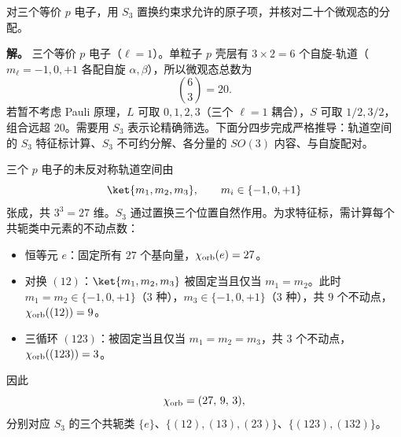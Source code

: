 \begin{example}[{$p^3$ 构型：$S_3$ 约束给出 $^4S,{}^2D,{}^2P$}]
对三个等价 $p$ 电子，用 $S_3$ 置换约束求允许的原子项，并核对二十个微观态的分配。

\textbf{解。} 三个等价 $p$ 电子（$\ell=1$）。单粒子 $p$ 壳层有 $3\times2=6$ 个自旋-轨道（$m_\ell=-1,0,+1$ 各配自旋 $\alpha,\beta$），所以微观态总数为
\[
\binom63=20.
\]
若暂不考虑 Pauli 原理，$L$ 可取 $0,1,2,3$（三个 $\ell=1$ 耦合），$S$ 可取 $1/2,3/2$，组合远超 20。需要用 $S_3$ 表示论精确筛选。下面分四步完成严格推导：轨道空间的 $S_3$ 特征标计算、$S_3$ 不可约分解、各分量的 $SO(3)$ 内容、与自旋配对。

三个 $p$ 电子的未反对称轨道空间由
\[
\ket{m_1,m_2,m_3},\qquad m_i\in\{-1,0,+1\}
\]
张成，共 $3^3=27$ 维。$S_3$ 通过置换三个位置自然作用。为求特征标，需计算每个共轭类中元素的不动点数：
\begin{itemize}
\item 恒等元 $e$：固定所有 $27$ 个基向量，$\chi_{\rm orb}(e)=27$。
\item 对换 $(12)$：$\ket{m_1,m_2,m_3}$ 被固定当且仅当 $m_1=m_2$。此时 $m_1=m_2\in\{-1,0,+1\}$（$3$ 种），$m_3\in\{-1,0,+1\}$（$3$ 种），共 $9$ 个不动点，$\chi_{\rm orb}((12))=9$。
\item 三循环 $(123)$：被固定当且仅当 $m_1=m_2=m_3$，共 $3$ 个不动点，$\chi_{\rm orb}((123))=3$。
\end{itemize}
因此
\[
\chi_{\rm orb}=(27,\,9,\,3),
\]
分别对应 $S_3$ 的三个共轭类 $\{e\}$、$\{(12),(13),(23)\}$、$\{(123),(132)\}$。


\end{example}
